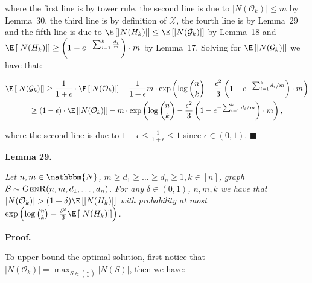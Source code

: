 where the first line is by tower rule, the second line is due to $|N(\mathcal{O}_{k})|\leq m$ by Lemma 30, the third line is by definition of $\mathcal{X}$, the fourth line is by Lemma 29 and the fifth line is due to $\E\left[|N(H_{k})|\right]\leq\E\left[|N(\mathcal{G}_{k})|\right]$ by Lemma 18 and $\E\left[|N(H_{k})|\right]\geq\left(1-e^{-\sum_{i=1}^{k}\frac{d_{i}}{m}}\right)\cdot m$ by Lemma 17.
Solving for $\E\left[|N(\mathcal{G}_{k})|\right]$ we have that:\par


\[\begin{gathered}
\displaystyle\E\left[|N(\mathcal{G}_{k})|\right] \displaystyle\geq\frac{1}{1+\epsilon}\cdot\E\left[|N(\mathcal{O}_{k})|\right]-\frac{1}{1+\epsilon}m\cdot\exp\left(\log{\binom{n}{k}}-\frac{\epsilon^{2}}{3}\left(1-e^{-\sum_{i=1}^{k}d_{i}/m}\right)\cdot m\right) \\
\displaystyle\geq(1-\epsilon)\cdot\E\left[|N(\mathcal{O}_{k})|\right]-m\cdot\exp\left(\log{\binom{n}{k}}-\frac{\epsilon^{2}}{3}\left(1-e^{-\sum_{i=1}^{k}d_{i}/m}\right)\cdot m\right),
\end{gathered}\]


where the second line is due to $1-\epsilon\leq\frac{1}{1+\epsilon}\leq 1$ since $\epsilon\in(0,1)$.
\ensuremath{\blacksquare}\par






\par\medskip\noindent\textbf{\textbf{Lemma 29}\textbf{.}}\par



\emph{Let $n,m\in\mathbbm{N}$, $m\geq d_{1}\geq\dots\geq d_{n}\geq 1,k\in[n]$, graph $\mathcal{B}\sim\textsc{GenR}(n,m,d_{1},\dots,d_{n})$.
For any $\delta\in(0,1)$, $n,m,k$ we have that $|N(\mathcal{O}_{k})|>(1+\delta)\E\left[|N(H_{k})|\right]$ with probability at most $\exp\left(\log{\binom{n}{k}}-\frac{\delta^{2}}{3}\E\left[|N(H_{k})|\right]\right)$.}\par






\par\medskip\noindent\textbf{Proof.}\par



To upper bound the optimal solution, first notice that $|N(\mathcal{O}_{k})|=\max_{S\in\binom{L}{k}}|N(S)|$, then we have:\par


